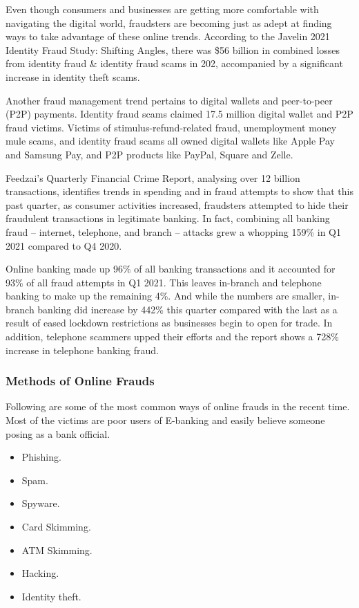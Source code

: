 \documentclass[12pt, oneside, a4paper]{article}
\begin{document}
Even though consumers and businesses are getting more comfortable with navigating the digital world, fraudsters are becoming just as adept at finding ways to take advantage of these online trends. According to the Javelin 2021 Identity Fraud Study: Shifting Angles, there was \$56 billion in combined losses from identity fraud & identity fraud scams in 202, accompanied by a significant increase in identity theft scams.

Another fraud management trend pertains to digital wallets and peer-to-peer (P2P) payments. Identity fraud scams claimed 17.5 million digital wallet and P2P fraud victims. Victims of stimulus-refund-related fraud, unemployment money mule scams, and identity fraud scams all owned digital wallets like Apple Pay and Samsung Pay, and P2P products like PayPal, Square and Zelle. 

Feedzai's Quarterly Financial Crime Report, analysing over 12 billion transactions, identifies trends in spending and in fraud attempts to show that this past quarter, as consumer activities increased, fraudsters attempted to hide their fraudulent transactions in legitimate banking. In fact, combining all banking fraud  – internet, telephone, and branch – attacks grew a whopping 159\% in Q1 2021 compared to Q4 2020. 

Online banking made up 96\% of all banking transactions and it accounted for 93\% of all fraud attempts in Q1 2021. This leaves in-branch and telephone banking to make up the remaining 4\%. And while the numbers are smaller, in-branch banking did increase by 442\% this quarter compared with the last as a result of eased lockdown restrictions as businesses begin to open for trade. In addition, telephone scammers upped their efforts and the report shows a 728\% increase in telephone banking fraud.

\subsubsection{Methods of Online Frauds}
Following are some of the most common ways of online frauds in the recent time. Most of the victims are poor users of E-banking and easily believe someone posing as a bank official.
\begin{itemize}
    \item Phishing.
    \item Spam.
    \item Spyware.
    \item Card Skimming.
    \item ATM Skimming.
    \item Hacking.
    \item Identity theft.
\end{itemize}
\end{document}
